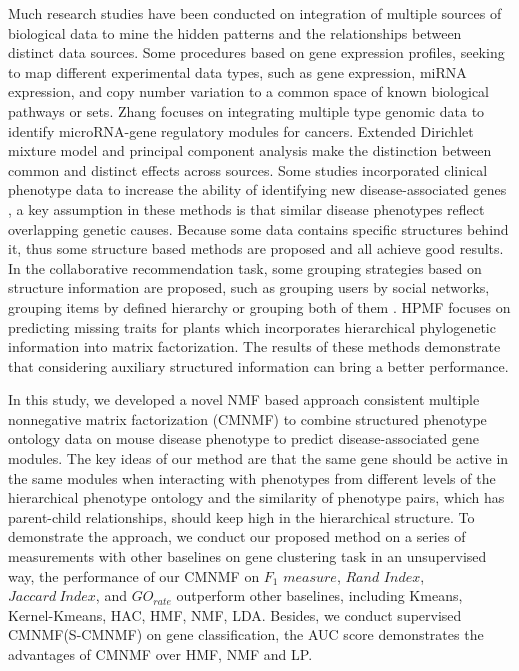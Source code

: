 \documentclass{bmcart}
\begin{document}
Much research studies have been conducted on integration of multiple sources of biological data to mine the hidden patterns and the relationships between distinct data sources. Some procedures based on gene expression profiles, seeking to map different experimental data types, such as gene expression, miRNA expression, and copy number variation to a common space of known biological pathways or sets\cite{Khatri2012,Mitrea2013}. Zhang\cite{Zhang2011} focuses on integrating multiple type genomic data to identify microRNA-gene regulatory modules for cancers. Extended Dirichlet mixture model\cite{Lock2013} and principal component analysis\cite{Lock2013a} make the distinction between common and distinct effects across sources. Some studies incorporated clinical phenotype data to increase the ability of identifying new disease-associated genes\cite{Hwang2012,Lage2007,Li2010,Vanunu2010,Wu2008a,Wu2008b}
, a key assumption in these methods is that similar disease phenotypes reflect overlapping genetic causes\cite{Houle2010}.
 Because some data contains specific structures behind it, thus some structure based methods are proposed and all achieve good results. In the collaborative recommendation task, some grouping strategies based on structure information are proposed, such as grouping users by social networks, grouping items by defined hierarchy or grouping both of them \cite{Wang2014,Ma2008,AliMashhoori2012}. HPMF\cite{Shan2012} focuses on predicting missing traits for plants which incorporates hierarchical phylogenetic information into matrix factorization. The results of these methods demonstrate that considering auxiliary structured information can bring a better performance.

In this study, we developed a novel NMF based approach consistent multiple nonnegative matrix factorization (CMNMF) to combine structured phenotype ontology data on mouse disease phenotype to predict disease-associated gene modules. The key ideas of our method are that the same gene should be active in the same modules when interacting with phenotypes from different levels of the hierarchical phenotype ontology  and the similarity of phenotype pairs, which has parent-child relationships, should keep high in the hierarchical structure. To demonstrate the approach, we conduct our proposed method on a series of measurements with other baselines on gene clustering task in an unsupervised way, the performance of our CMNMF on $F_1$ $measure$, $Rand$ $Index$, $Jaccard\ Index$, and $GO_{rate}$ outperform other baselines, including Kmeans, Kernel-Kmeans\cite{Dhillon2004}, HAC\cite{Ward1963}, HMF\cite{AliMashhoori2012}, NMF\cite{Lee1999}, LDA\cite{Blei2003}. Besides, we conduct supervised CMNMF(S-CMNMF) on gene classification, the AUC score demonstrates the advantages of CMNMF over HMF, NMF and LP\cite{Raghavan2007}.
\end{document}
